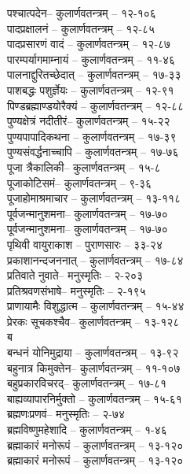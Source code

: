 \begin{raggedright}
\begin{parcolumns}[colwidths={1=.55\textwidth,2=.55\textwidth}]{2}
{पश्चात्पदेन– 	कुलार्णवतन्त्रम्  – १२-१०६\\
पादप्रक्षालनं	–    कुलार्णवतन्त्रम्  – १२-८५\\
पादप्रसारणं वादं	– 	कुलार्णवतन्त्रम्  – १२-८७\\
पारम्पर्यागमाम्नायं	– 	कुलार्णवतन्त्रम्  – ११-४६\\
पालनाद्दुरितच्छेदात्	– 	कुलार्णवतन्त्रम्  – १७-३३	\\
पाशबद्धः पशुर्ज्ञेयः	– 	कुलार्णवतन्त्रम्  – १२-९१\\
पिण्डब्रह्माण्डयोरैक्यं	– 	कुलार्णवतन्त्रम्  – १२-८८\\
पुण्यक्षेत्रं नदीतीरं– 	कुलार्णवतन्त्रम्  – १५-२२\\
पुण्यपापादिकथना	– 	कुलार्णवतन्त्रम्  – १७-३९	\\
पुण्यसंवर्द्धनाच्चापि	– 	कुलार्णवतन्त्रम्  – १७-७६	\\
पूजा त्रैकालिकी– 	कुलार्णवतन्त्रम्  – १५-८\\
पूजाकोटिसमं– 	कुलार्णवतन्त्रम्  – ९-३६\\
पूजाहोमाश्रमाचार	– 	कुलार्णवतन्त्रम्  – १३-११८\\
पूर्वजन्मानुशमना– 	 कुलार्णवतन्त्रम्  – १७-७०\\
पूर्वजन्मानुशमना– 	कुलार्णवतन्त्रम्  – १७-७०\\
पृथिवी वायुराकाश	– 	पुराणसारः   – ३३-२४\\
प्रकाशानन्दजननात्	– 	कुलार्णवतन्त्रम्  – १७-८४	\\
प्रतिवातेनुवाते– 	मनुस्मृतिः  – २-२०३\\
प्रतिश्रवणसंभाषे– 	मनुस्मृतिः  – २-१९५\\
प्राणायामैः विशुद्धात्म	– 	कुलार्णवतन्त्रम्  – १५-४४\\
प्रेरकः सूचकश्चैव– 	कुलार्णवतन्त्रम्  – १३-१२८\\
{\large ब}\\
बन्धनं योनिमुद्राया	– 	कुलार्णवतन्त्रम्  – १३-९२\\
बहुनात्र किमुक्तेन– 	कुलार्णवतन्त्रम्  – ११-१०७\\
बहुप्रकारविचरद्– 	 कुलार्णवतन्त्रम्  – १७-८१\\
बाह्यव्यापारनिर्मुक्तो	– 	कुलार्णवतन्त्रम्  – १५-६१\\
ब्रह्मणःप्रणवं– 	मनुस्मृतिः  – २-७४\\
ब्रह्मविष्णुमहेशादि –  कुलार्णवतन्त्रम्  – १-४६\\
ब्रह्माकारं मनोरूपं	– 	कुलार्णवतन्त्रम्  – १३-१२०\\
ब्रह्माकारं मनोरूपं	– 	कुलार्णवतन्त्रम्  – १३-१२०\\
}
\end{parcolumns}
\end{raggedright}
